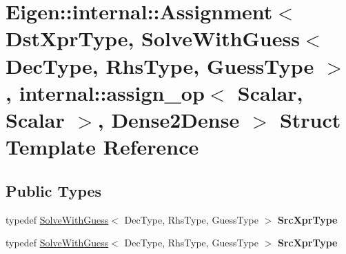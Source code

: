 \hypertarget{struct_eigen_1_1internal_1_1_assignment_3_01_dst_xpr_type_00_01_solve_with_guess_3_01_dec_type_092a64ffd1d5684a219c114a5d8922118}{}\section{Eigen\+:\+:internal\+:\+:Assignment$<$ Dst\+Xpr\+Type, Solve\+With\+Guess$<$ Dec\+Type, Rhs\+Type, Guess\+Type $>$, internal\+:\+:assign\+\_\+op$<$ Scalar, Scalar $>$, Dense2\+Dense $>$ Struct Template Reference}
\label{struct_eigen_1_1internal_1_1_assignment_3_01_dst_xpr_type_00_01_solve_with_guess_3_01_dec_type_092a64ffd1d5684a219c114a5d8922118}
\subsection*{Public Types}
\begin{DoxyCompactItemize}
\item 
\mbox{\label{struct_eigen_1_1internal_1_1_assignment_3_01_dst_xpr_type_00_01_solve_with_guess_3_01_dec_type_092a64ffd1d5684a219c114a5d8922118_affc5272654093c02547a24c799bc6847}} 
typedef \hyperlink{group___iterative_linear_solvers___module_class_eigen_1_1_solve_with_guess}{Solve\+With\+Guess}$<$ Dec\+Type, Rhs\+Type, Guess\+Type $>$ {\bfseries Src\+Xpr\+Type}
\item 
\mbox{\label{struct_eigen_1_1internal_1_1_assignment_3_01_dst_xpr_type_00_01_solve_with_guess_3_01_dec_type_092a64ffd1d5684a219c114a5d8922118_affc5272654093c02547a24c799bc6847}} 
typedef \hyperlink{group___iterative_linear_solvers___module_class_eigen_1_1_solve_with_guess}{Solve\+With\+Guess}$<$ Dec\+Type, Rhs\+Type, Guess\+Type $>$ {\bfseries Src\+Xpr\+Type}
\end{DoxyCompactItemize}

